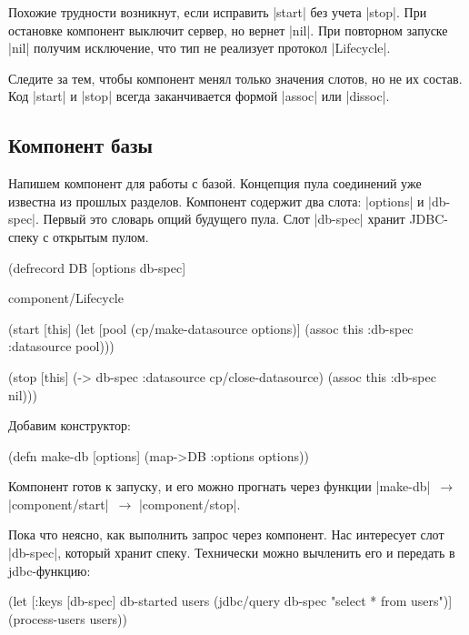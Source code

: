 Похожие трудности возникнут, если исправить \spverb|start| без учета
\spverb|stop|. При остановке компонент выключит сервер, но вернет
\spverb|nil|. При повторном запуске \spverb|nil| получим исключение, что тип не
реализует протокол \spverb|Lifecycle|.

Следите за тем, чтобы компонент менял только значения слотов, но не их
состав. Код \spverb|start| и \spverb|stop| всегда заканчивается формой
\spverb|assoc| или \spverb|dissoc|.

\subsection{Компонент базы}

Напишем компонент для работы с базой. Концепция пула соединений уже известна из
прошлых разделов. Компонент содержит два слота: \spverb|options| и
\spverb|db-spec|. Первый это словарь опций будущего пула. Слот \spverb|db-spec|
хранит JDBC-спеку с открытым пулом.

\begin{english}
  \begin{clojure}
(defrecord DB
    [options db-spec]

  component/Lifecycle

  (start [this]
    (let [pool (cp/make-datasource options)]
      (assoc this :db-spec {:datasource pool})))

  (stop [this]
    (-> db-spec :datasource cp/close-datasource)
    (assoc this :db-spec nil)))
  \end{clojure}
\end{english}

Добавим конструктор:

\begin{english}
  \begin{clojure}
(defn make-db [options]
  (map->DB {:options options}))
  \end{clojure}
\end{english}

Компонент готов к запуску, и его можно прогнать через функции
\spverb|make-db|~$\to$ \spverb|component/start|~$\to$ \spverb|component/stop|.

Пока что неясно, как выполнить запрос через компонент. Нас интересует слот
\spverb|db-spec|, который хранит спеку. Технически можно вычленить его и
передать в jdbc-функцию:

\begin{english}
  \begin{clojure}
(let [{:keys [db-spec]} db-started
      users (jdbc/query db-spec "select * from users")]
  (process-users users))
  \end{clojure}
\end{english}

